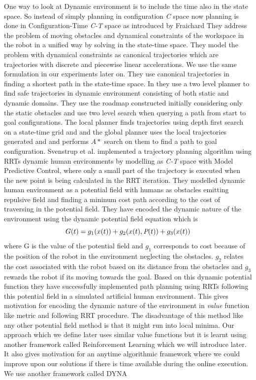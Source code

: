 \documentclass[MTech]{iitmdiss}
\begin{document}
One way to look at Dynamic environment is to include the time also in the state space. So instead of simply planning in configuration \emph{C} space now planning is done in Configuration-Time \emph{C-T} space as introduced by Fraichard
\cite{fraichard99} 
 They address the problem of moving obstacles and dynamical constraints of the workspace in the robot in a unified way by solving in the state-time space. They model the problem with dynamical constraints as canonical trajectories which are trajectories with discrete and piecewise linear accelerations. We use the same formulation in our experiments later on. They use canonical trajectories in finding a shortest path in the state-time space.  In 
\cite{jm05} 
  they use a two level planner to find safe trajectories in dynamic environment consisting of both static and dynamic domains. They use the roadmap constructed initially considering only the static obstacles and use two level search when querying a path from start to goal configurations. The local planner finds trajectories using depth first search on a state-time grid and and the global planner uses the local trajectories generated and and performs $A*$ \cite{hnb68} search on them to find a path to goal configuration.
Svenstrup et al. \cite{svestrup10}
implemented a trajectory planning algorithm using RRTs dynamic human environments by modelling as \emph{C-T} space with Model Predictive Control, where only a small part of the trajectory is executed when the new point is being calculated in the RRT iteration. They modelled dynamic human environment as a potential field with humans as obstacles emitting repulsive field and finding a mininum cost path according to the cost of traversing in the potential field. They have encoded the dynamic nature of the environment using the dynamic potential field equation which is 
$$G(t) = g_1(x(t)) + g_2(x(t), \emph{P}(t) )+ g_3(x(t)) $$
where G is the value of the potential field and $g_1$ corresponds to cost because of the position of the robot in the environment neglecting the obstacles. $g_2$ relates the cost associated with the robot based on its distance from the obstacles and $g_3$ rewards the robot if its moving towards the goal. Based on this dynamic potential function they have successfully implemented path planning using RRTs following this potential field in a simulated artificial human environment. This gives motivation for encoding the dynamic nature of the environment in \textit{value} function like metric and following RRT procedure. The disadvantage of this method like any other potential field method is that it might run into local minima. Our approach which we define later uses similar value functions but it is learnt using another framework called Reinforcement Learning which we will introduce later. It also gives motivation for an anytime algorithmic framework where we could improve upon our solutions if there is time available during the online execution. We use another framework called DYNA 
\end{document}
